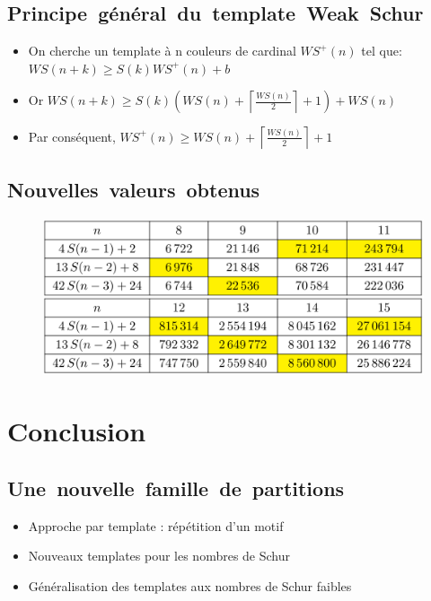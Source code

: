 \documentclass[graphics]{beamer}
\begin{document}
\subsection{Principe~général~du~template~Weak~Schur}
\begin{frame}


\begin{itemize}
\item On cherche un template à n couleurs de cardinal $WS^+(n)$ tel que:
\newline $WS(n+k) \geqslant S(k)WS^+(n)+b$
\vspace{8 mm}
\item Or $WS (n+k) \geqslant S(k) \left (WS (n) + \left \lceil 					\displaystyle \frac{WS (n)}{2}
			\right \rceil +1 \right) + WS (n)$
			\vspace{8 mm}
\item Par conséquent, $WS^+(n) \geqslant WS (n) + \left \lceil 					\displaystyle \frac{WS (n)}{2}
			\right \rceil +1 $
\end{itemize}

\end{frame}

\subsection{Nouvelles~valeurs~obtenus}

\begin{frame}
\begin{figure}
        \centering
        \includegraphics[scale=0.30]{tableau_resultat.png}
\end{figure}
\end{frame}


\section{Conclusion}

\subsection{Une~nouvelle~famille~de~partitions}
\begin{frame}
	\begin{itemize}
		\setlength\itemsep{2.5ex}
		\item Approche par template : répétition d'un motif
		\item Nouveaux templates pour les nombres de Schur
		\item Généralisation des templates aux nombres de Schur faibles
	\end{itemize}
\end{frame}
\end{document}
